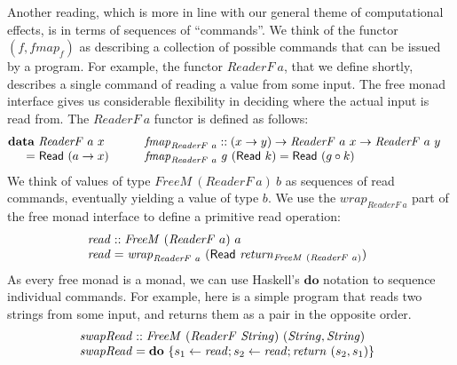 \documentclass{jfp1}
\newcommand{\kw}[1]{\textbf{#1}}
\begin{document}
Another reading, which is more in line with our general theme of
computational effects, is in terms of sequences of ``commands''. We
think of the functor $(f, \mathit{fmap}_f)$ as describing a collection
of possible commands that can be issued by a program. For example, the
functor $\mathit{ReaderF}~a$, that we define shortly, describes a
single command of reading a value from some input. The free monad
interface gives us considerable flexibility in deciding where the
actual input is read from. The $\mathit{ReaderF}~a$ functor is defined
as follows:
\begin{displaymath}
  \begin{array}{@{}l@{\hspace{2em}}l}
    \begin{array}{@{}l}
      \kw{data}~\mathit{ReaderF}~a~x \\
      \quad
      \begin{array}{c@{\hspace{0.3em}}l}
        = & \mathsf{Read}~(a \to x)
      \end{array}
    \end{array}
    &
    \begin{array}{@{}l}
      \mathit{fmap}_{\mathit{ReaderF}~a} :: (x \to y) \to \mathit{ReaderF}~a~x \to \mathit{ReaderF}~a~y \\
      \mathit{fmap}_{\mathit{ReaderF}~a}~g~(\mathsf{Read}~k) = \mathsf{Read}~(g \circ k)
    \end{array}
  \end{array}
\end{displaymath}
We think of values of type $\mathit{FreeM}~(\mathit{ReaderF}~a)~b$ as
sequences of read commands, eventually yielding a value of type
$b$. We use the $\mathit{wrap}_{\mathit{ReaderF}~a}$ part of the free
monad interface to define a primitive read operation:
\begin{displaymath}
  \begin{array}{@{}l}
    \mathit{read} :: \mathit{FreeM}~(\mathit{ReaderF}~a)~a \\
    \mathit{read} = \mathit{wrap}_{\mathit{ReaderF}~a}~(\mathsf{Read}~\mathit{return}_{\mathit{FreeM}~(\mathit{ReaderF}~a)})
  \end{array}
\end{displaymath}
As every free monad is a monad, we can use Haskell's $\kw{do}$
notation to sequence individual commands. For example, here is a
simple program that reads two strings from some input, and returns
them as a pair in the opposite order.
\begin{displaymath}
  \begin{array}{@{}l}
  \mathit{swapRead} :: \mathit{FreeM}~(\mathit{ReaderF}~\mathit{String})~(\mathit{String},\mathit{String}) \\
  \mathit{swapRead} = \kw{do}~\{ s_1 \leftarrow \mathit{read}; s_2 \leftarrow \mathit{read}; \mathit{return}~(s_2,s_1) \}
\end{array}
\end{displaymath}
\end{document}
